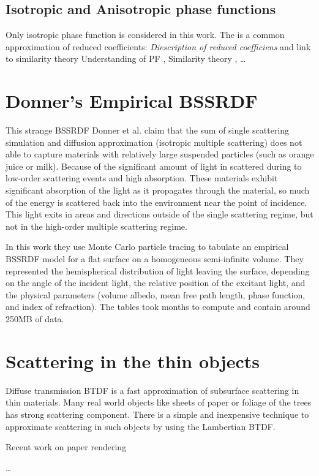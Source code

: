 \subsection{Isotropic and Anisotropic phase functions}
\label{section:phasefunction_approximation}
Only isotropic phase function is considered in this work. The is a common approximation of reduced
coefficients:
\emph{Diescription of reduced coefficiens} and link to similarity theory
Understanding of PF \cite{Gkioulekas:2013:URP:2516971.2516972}, Similarity theory
\cite{Zhao:2014:HSR:2601097.2601104}, \cite{Gkioulekas:2013:IVR:2508363.2508377}
\ldots

\section{Donner's Empirical BSSRDF}
This strange \gls{BSSRDF}
Donner et al. \cite{Donner:2009:EBM} claim that the sum of single scattering
simulation and diffusion approximation (isotropic multiple scattering) does not
able to capture materials with relatively large suspended particles (such as
orange juice or milk). Because of the significant amount of light in scattered
during to low-order scattering events and high absorption.
These materials exhibit significant absorption of the light as it propagates
through the material, so much of the energy is scattered back into
the environment near the point of incidence. This light exits in areas and
directions outside of the single scattering regime, but not in the high-order
multiple scattering regime.


In this work they use Monte Carlo particle tracing to tabulate an empirical
BSSRDF model for a flat surface on a homogeneous semi-infinite volume.
They represented the hemispherical distribution of light leaving the surface,
depending on the angle of the incident light, the relative position of the
excitant light, and the physical parameters (volume albedo, mean free path
length, phase function, and index of refraction). The tables took months to
compute and contain around 250MB of data.

\section{Scattering in the thin objects}
Diffuse transmission BTDF is a fast approximation of subsurface scattering
in thin materials.
Many real world objects like sheets of paper or foliage of the trees has strong
scattering component. There is a simple and inexpensive technique to approximate
scattering in such objects by using the Lambertian BTDF.

Recent work on paper rendering \cite{DBLP:journals/cgf/PapasMJ14}

\ldots
